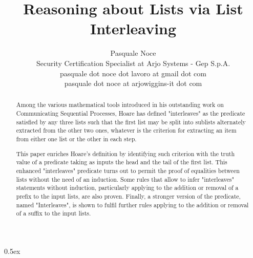 \documentclass[11pt,a4paper]{article}
\begin{document}
\title{Reasoning about Lists via List Interleaving}
\author{Pasquale Noce\\Security Certification Specialist at Arjo Systems - Gep S.p.A.\\pasquale dot noce dot lavoro at gmail dot com\\pasquale dot noce at arjowiggins-it dot com}
\maketitle

\begin{abstract}
Among the various mathematical tools introduced in his outstanding work on
Communicating Sequential Processes, Hoare has defined "interleaves" as the
predicate satisfied by any three lists such that the first list may be split
into sublists alternately extracted from the other two ones, whatever is the
criterion for extracting an item from either one list or the other in each step.

This paper enriches Hoare's definition by identifying such criterion with the
truth value of a predicate taking as inputs the head and the tail of the first
list. This enhanced "interleaves" predicate turns out to permit the proof of
equalities between lists without the need of an induction. Some rules that allow
to infer "interleaves" statements without induction, particularly applying to
the addition or removal of a prefix to the input lists, are also proven.
Finally, a stronger version of the predicate, named "Interleaves", is shown to
fulfil further rules applying to the addition or removal of a suffix to the
input lists.
\end{abstract}

\tableofcontents

\parindent 0pt\parskip 0.5ex





\end{document}

